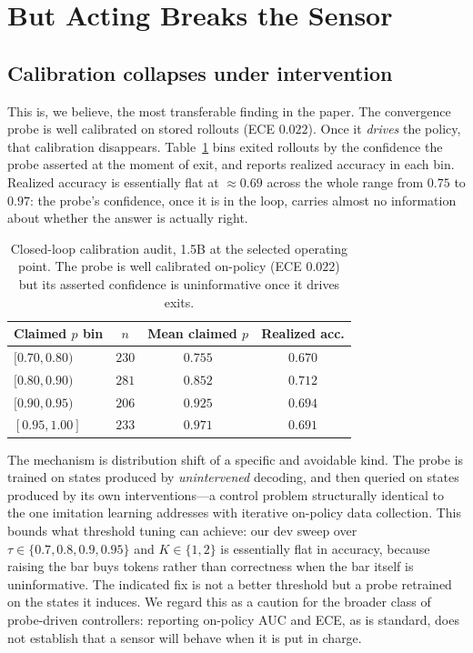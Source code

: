 \section{But Acting Breaks the Sensor}
\label{sec:breaks}

\subsection{Calibration collapses under intervention}
\label{sec:audit}

This is, we believe, the most transferable finding in the paper. The
convergence probe is well calibrated on stored rollouts (ECE $0.022$). Once it
\emph{drives} the policy, that calibration disappears. Table~\ref{tab:audit}
bins exited rollouts by the confidence the probe asserted at the moment of
exit, and reports realized accuracy in each bin. Realized accuracy is
essentially flat at $\approx 0.69$ across the whole range from $0.75$ to
$0.97$: the probe's confidence, once it is in the loop, carries almost no
information about whether the answer is actually right.

\begin{table}[t]
\centering
\small
\begin{tabular}{lccc}
\toprule
Claimed $p$ bin & $n$ & Mean claimed $p$ & Realized acc. \\
\midrule
$[0.70,0.80)$ & $230$ & $0.755$ & $0.670$ \\
$[0.80,0.90)$ & $281$ & $0.852$ & $0.712$ \\
$[0.90,0.95)$ & $206$ & $0.925$ & $0.694$ \\
$[0.95,1.00]$ & $233$ & $0.971$ & $0.691$ \\
\bottomrule
\end{tabular}
\caption{Closed-loop calibration audit, 1.5B at the selected operating point.
The probe is well calibrated on-policy (ECE $0.022$) but its asserted
confidence is uninformative once it drives exits.}
\label{tab:audit}
\end{table}

The mechanism is distribution shift of a specific and avoidable kind. The
probe is trained on states produced by \emph{unintervened} decoding, and then
queried on states produced by its own interventions---a control problem
structurally identical to the one imitation learning addresses with iterative
on-policy data collection. This bounds what threshold tuning can achieve: our
dev sweep over $\tau \in \{0.7,0.8,0.9,0.95\}$ and $K \in \{1,2\}$ is
essentially flat in accuracy, because raising the bar buys tokens rather than
correctness when the bar itself is uninformative. The indicated fix is not a
better threshold but a probe retrained on the states it induces. We regard
this as a caution for the broader class of probe-driven controllers: reporting
on-policy AUC and ECE, as is standard, does not establish that a sensor will
behave when it is put in charge.

